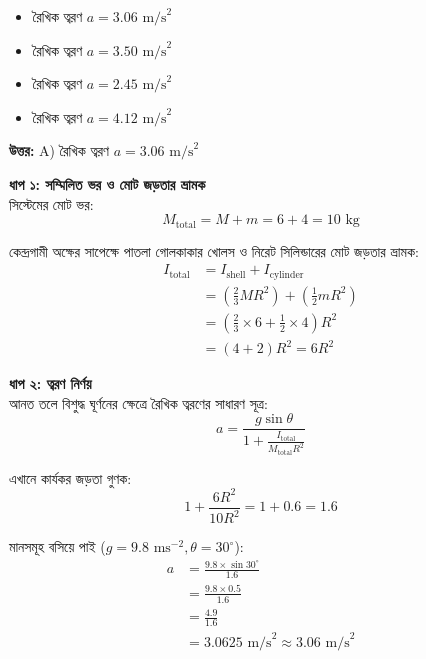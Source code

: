 \documentclass[12pt, a4paper]{article}
\begin{document}
\begin{itemize}[label={}, leftmargin=1cm, itemsep=0.5em]
    \item[\textbf{A)}] রৈখিক ত্বরণ $a = 3.06\text{ m/s}^2$
    \item[\textbf{B)}] রৈখিক ত্বরণ $a = 3.50\text{ m/s}^2$
    \item[\textbf{C)}] রৈখিক ত্বরণ $a = 2.45\text{ m/s}^2$
    \item[\textbf{D)}] রৈখিক ত্বরণ $a = 4.12\text{ m/s}^2$
\end{itemize}

\vspace{0.5em}
\begin{tcolorbox}[answerbox]
    \textbf{\color{success} উত্তর:} A) রৈখিক ত্বরণ $a = 3.06\text{ m/s}^2$
\end{tcolorbox}
\vspace{1em}

\begin{tcolorbox}[solutionbox={সমাধান (Solution)}]
    \noindent
    \textbf{ধাপ ১: সম্মিলিত ভর ও মোট জড়তার ভ্রামক} \\
    সিস্টেমের মোট ভর:
    \[ M_{\text{total}} = M + m = 6 + 4 = 10\text{ kg} \]
    
    কেন্দ্রগামী অক্ষের সাপেক্ষে পাতলা গোলকাকার খোলস ও নিরেট সিলিন্ডারের মোট জড়তার ভ্রামক:
    \begin{align*}
        I_{\text{total}} &= I_{\text{shell}} + I_{\text{cylinder}} \\
        &= \left(\frac{2}{3} M R^2\right) + \left(\frac{1}{2} m R^2\right) \\
        &= \left(\frac{2}{3} \times 6 + \frac{1}{2} \times 4\right) R^2 \\
        &= (4 + 2) R^2 = 6 R^2
    \end{align*}
    
    \vspace{0.5em}
    \noindent\textbf{ধাপ ২: ত্বরণ নির্ণয়} \\
    আনত তলে বিশুদ্ধ ঘূর্ণনের ক্ষেত্রে রৈখিক ত্বরণের সাধারণ সূত্র:
    \[ a = \frac{g \sin\theta}{1 + \frac{I_{\text{total}}}{M_{\text{total}} R^2}} \]
    
    এখানে কার্যকর জড়তা গুণক:
    \[ 1 + \frac{6 R^2}{10 R^2} = 1 + 0.6 = 1.6 \]
    
    মানসমূহ বসিয়ে পাই ($g = 9.8\text{ ms}^{-2}, \theta = 30^\circ$):
    \begin{align*}
        a &= \frac{9.8 \times \sin 30^\circ}{1.6} \\
          &= \frac{9.8 \times 0.5}{1.6} \\
          &= \frac{4.9}{1.6} \\
          &= \mathbf{3.0625}\text{ m/s}^2 \approx \mathbf{3.06}\text{ m/s}^2
    \end{align*}
\end{tcolorbox}
\end{document}
